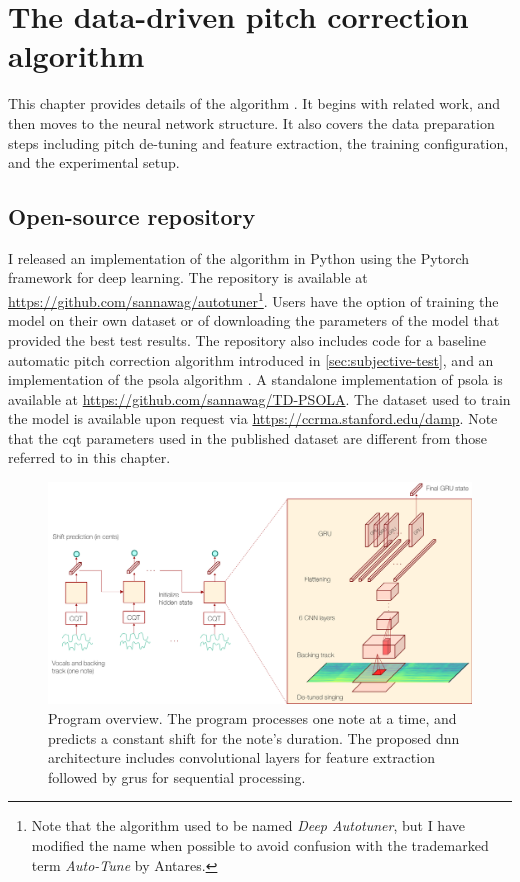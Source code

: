 \chapter{The data-driven pitch correction algorithm}
\label{chap:thesis-autotuner}
This chapter provides details of the algorithm \cite{wager2020deep}. It begins with related work, and then moves to the neural network structure. It also covers the data preparation steps including pitch de-tuning and feature extraction, the training configuration, and the experimental setup. 




\section{Open-source repository}
I released an implementation of the algorithm in Python using the Pytorch framework for deep learning. The repository is available at \url{https://github.com/sannawag/autotuner}\footnote{Note that the algorithm used to be named \textit{Deep Autotuner}, but I have modified the name when possible to avoid confusion with the trademarked term \textit{Auto-Tune} by Antares.}. Users have the option of training the model on their own dataset or of downloading the parameters of the model that provided the best test results. The repository also includes code for a baseline automatic pitch correction algorithm introduced in \ref{sec:subjective-test}, and an implementation of the \gls{psola} algorithm \cite{charpentier1986diphone}. A standalone implementation of \gls{psola} is available at \url{https://github.com/sannawag/TD-PSOLA}. The dataset used to train the model is available upon request via \url{https://ccrma.stanford.edu/damp}. Note that the \gls{cqt} parameters used in the published dataset are different from those referred to in this chapter.

\begin{figure}[t!]
    \centering
    \includegraphics[width=\columnwidth]{images/model_outline.png}
    \caption{Program overview. The program processes one note at a time, and predicts a constant shift for the note's duration. The proposed \gls{dnn} architecture includes convolutional layers for feature extraction followed by \gls{gru}s for sequential processing.}
    \label{fig:model_outline}
\end{figure}

